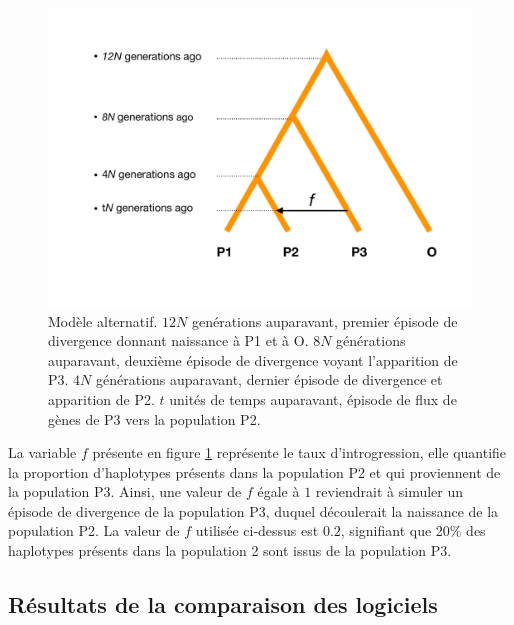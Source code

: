 \documentclass[12pt,twoside]{reedthesis}
\begin{document}
  \begin{figure}
  
  {\centering \includegraphics[scale=0.5]{figure/alternate} 
  
  }
  
  \caption{Modèle alternatif. $12N$ genérations auparavant, premier épisode de divergence donnant naissance à P1 et à O. $8N$ générations auparavant, deuxième épisode de divergence voyant l'apparition de P3. $4N$ générations auparavant, dernier épisode de divergence et apparition de P2. $t$ unités de temps auparavant, épisode de flux de gènes de P3 vers la population P2.}\label{fig:alternate}
  \end{figure}
  
  La variable \(f\) présente en figure \ref{fig:alternate} représente le
  taux d'introgression, elle quantifie la proportion d'haplotypes présents
  dans la population P2 et qui proviennent de la population P3. Ainsi, une
  valeur de \(f\) égale à \(1\) reviendrait à simuler un épisode de
  divergence de la population P3, duquel découlerait la naissance de la
  population P2. La valeur de \(f\) utilisée ci-dessus est \(0.2\),
  signifiant que 20\% des haplotypes présents dans la population 2 sont
  issus de la population P3.
  
  \subsection{Résultats de la comparaison des
  logiciels}\label{resultats-de-la-comparaison-des-logiciels}
  
\end{document}
